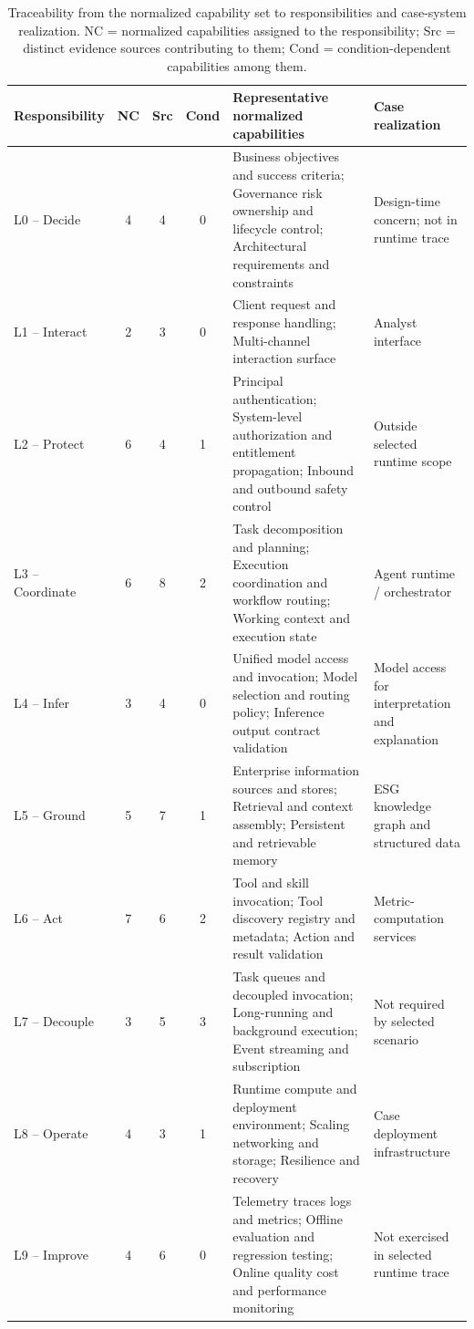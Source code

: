 \begin{table}[t]
\centering
\caption{Traceability from the normalized capability set to responsibilities and case-system realization.
NC = normalized capabilities assigned to the responsibility; Src = distinct evidence sources contributing
to them; Cond = condition-dependent capabilities among them.}
\label{tab:evaluation-traceability}
\small
\begin{tabular}{p{} c c c p{} p{}}
\hline
\textbf{Responsibility} & \textbf{NC} & \textbf{Src} & \textbf{Cond} &
\textbf{Representative normalized capabilities} & \textbf{Case realization} \\
\hline
L0 -- Decide & 4 & 4 & 0 & Business objectives and success criteria; Governance risk ownership and lifecycle control; Architectural requirements and constraints & Design-time concern; not in runtime trace \\
L1 -- Interact & 2 & 3 & 0 & Client request and response handling; Multi-channel interaction surface & Analyst interface \\
L2 -- Protect & 6 & 4 & 1 & Principal authentication; System-level authorization and entitlement propagation; Inbound and outbound safety control & Outside selected runtime scope \\
L3 -- Coordinate & 6 & 8 & 2 & Task decomposition and planning; Execution coordination and workflow routing; Working context and execution state & Agent runtime / orchestrator \\
L4 -- Infer & 3 & 4 & 0 & Unified model access and invocation; Model selection and routing policy; Inference output contract validation & Model access for interpretation and explanation \\
L5 -- Ground & 5 & 7 & 1 & Enterprise information sources and stores; Retrieval and context assembly; Persistent and retrievable memory & ESG knowledge graph and structured data \\
L6 -- Act & 7 & 6 & 2 & Tool and skill invocation; Tool discovery registry and metadata; Action and result validation & Metric-computation services \\
L7 -- Decouple & 3 & 5 & 3 & Task queues and decoupled invocation; Long-running and background execution; Event streaming and subscription & Not required by selected scenario \\
L8 -- Operate & 4 & 3 & 1 & Runtime compute and deployment environment; Scaling networking and storage; Resilience and recovery & Case deployment infrastructure \\
L9 -- Improve & 4 & 6 & 0 & Telemetry traces logs and metrics; Offline evaluation and regression testing; Online quality cost and performance monitoring & Not exercised in selected runtime trace \\
\hline
\end{tabular}
\end{table}
